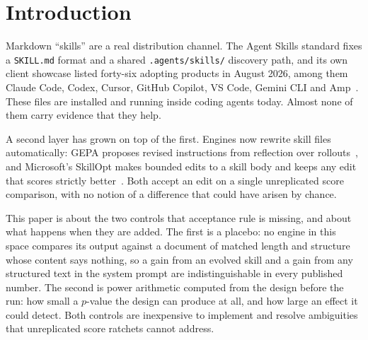 \section{Introduction}
\label{sec:intro}

Markdown ``skills'' are a real distribution channel. The Agent Skills
standard fixes a \texttt{SKILL.md} format and a shared
\texttt{.agents/skills/} discovery path, and its own client showcase listed
forty-six adopting products in August 2026, among them Claude Code, Codex,
Cursor, GitHub Copilot, VS Code, Gemini CLI and
Amp~\citep{agentskills2025}. These files are installed and running inside
coding agents today. Almost none of them carry evidence that they help.

A second layer has grown on top of the first. Engines now rewrite skill
files automatically: GEPA proposes revised instructions from reflection over
rollouts~\citep{gepa2026}, and Microsoft's SkillOpt makes bounded edits to a
skill body and keeps any edit that scores strictly
better~\citep{skillopt2026}. Both accept an edit on a single unreplicated
score comparison, with no notion of a difference that could have arisen by
chance.

This paper is about the two controls that acceptance rule is missing, and
about what happens when they are added. The first is a placebo: no engine in
this space compares its output against a document of matched length and
structure whose content says nothing, so a gain from an evolved skill and a
gain from any structured text in the system prompt are indistinguishable in
every published number. The second is power arithmetic computed from the
design before the run: how small a $p$-value the design can produce at all,
and how large an effect it could detect. Both controls are inexpensive to
implement and resolve ambiguities that unreplicated score ratchets cannot
address.

